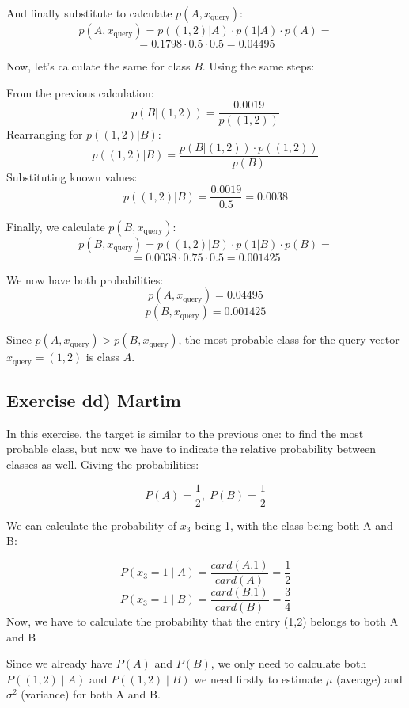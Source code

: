 \documentclass{article}
\begin{document}
And finally substitute to calculate \( p(A, x_\text{query}) \):
\[
p(A, x_\text{query}) = p((1,2) | A) \cdot p(1 | A) \cdot p(A) = 
\]
\[
= 0.1798 \cdot 0.5 \cdot 0.5 = 0.04495
\]

\bigskip

Now, let’s calculate the same for class \( B \). Using the same steps:

From the previous calculation:
\[
p(B | (1,2)) = \frac{0.0019}{p((1,2))}
\]
Rearranging for \( p((1,2) | B) \):
\[
p((1,2) | B) = \frac{p(B | (1,2)) \cdot p((1,2))}{p(B)}
\]
Substituting known values:
\[
p((1,2) | B) = \frac{0.0019}{0.5} = 0.0038
\]

Finally, we calculate \( p(B, x_\text{query}) \):
\[
p(B, x_\text{query}) = p((1,2) | B) \cdot p(1 | B) \cdot p(B) =
\]
\[
= 0.0038 \cdot 0.75 \cdot 0.5 = 0.001425
\]

\bigskip

We now have both probabilities:
\[
p(A, x_\text{query}) = 0.04495
\]
\[
p(B, x_\text{query}) = 0.001425
\]

Since \( p(A, x_\text{query}) > p(B, x_\text{query}) \), the most probable class for the query vector \( x_\text{query} = (1,2) \) is class \( A \).



\subsection{Exercise dd) Martim}
In this exercise, the target is similar to the previous one: to find the most probable class, but now we have to indicate the relative probability between classes as well.
\newline
\newline
Giving the probabilities:

\[
P(A) = \frac{1}{2},\;P(B) = \frac{1}{2}
\]

We can calculate the probability of \( x_3 \) being 1, with the class being both A and B:

\[
P(x_3 = 1 \mid A) = \frac{card(A.1)}{card(A)} = \frac{1}{2}
\]
\[
P(x_3 = 1 \mid B) = \frac{card(B.1)}{card(B)} = \frac{3}{4}
\]
\newline
Now, we have to calculate the probability that the entry (1,2) belongs to both A and B

Since we already have \( P(A) \) and \( P(B) \), we only need to calculate both \( P((1,2) \mid A) \) and \( P((1,2) \mid B) \)
we need firstly to estimate \( \mu \) (average) and \(\sigma^2\) (variance) for both A and B.
\end{document}

